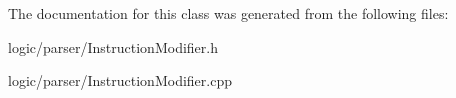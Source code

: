 The documentation for this class was generated from the following files\+:\begin{DoxyCompactItemize}
\item 
logic/parser/Instruction\+Modifier.\+h\item 
logic/parser/Instruction\+Modifier.\+cpp\end{DoxyCompactItemize}
